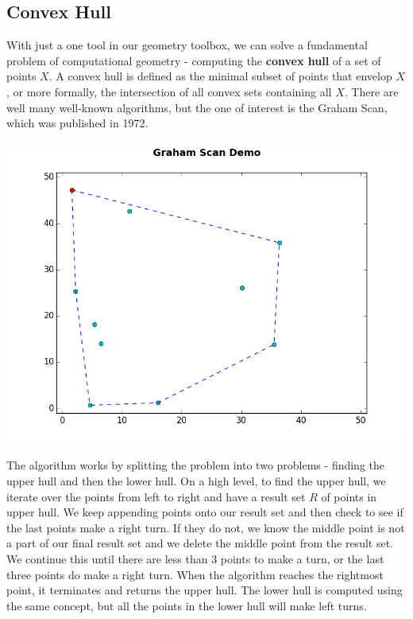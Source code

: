 \documentclass[10pt]{article}
\begin{document}
\begin{multicols}{2}
\subsection{Convex Hull}
\indent With just a one tool in our geometry toolbox, we can solve a fundamental problem of computational geometry - computing the \textbf{convex hull} of a set of points $X$. A convex hull is defined as the minimal subset of points that envelop $X$, or more formally, the intersection of all convex sets containing all $X$. There are well many well-known algorithms, but the one of interest is the Graham Scan, which was published in 1972. \newline \\
\centerline{\includegraphics[scale=0.4]{graham_scan.png}}
\indent The algorithm works by splitting the problem into two problems - finding the upper hull and then the lower hull. On a high level, to find the upper hull, we iterate over the points from left to right and have a result set $R$ of points in upper hull. We keep appending points onto our result set and then check to see if the last points make a right turn. If they do not, we know the middle point is not a part of our final result set and we delete the middle point from the result set. We continue this until there are less than 3 points to make a turn, or the last three points do make a right turn. When the algorithm reaches the rightmost point, it terminates and returns the upper hull. The lower hull is computed using the same concept, but all the points in the lower hull will make left turns. \newline \\

\end{multicols}
\end{document}
